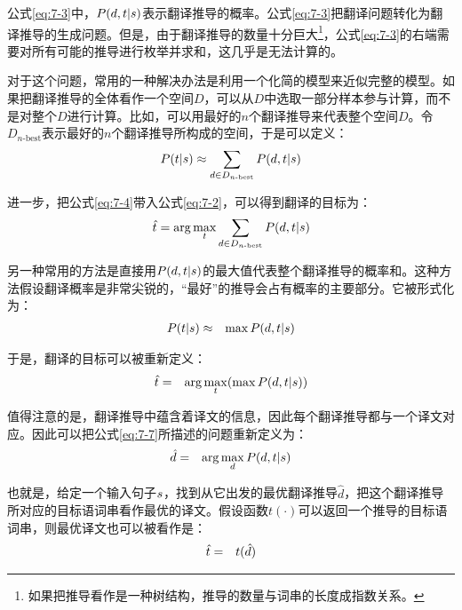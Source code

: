 \parinterval 公式\eqref{eq:7-3}中，${P}(d,{t}|{s})$表示翻译推导的概率。公式\eqref{eq:7-3}把翻译问题转化为翻译推导的生成问题。但是，由于翻译推导的数量十分巨大\footnote[3]{如果把推导看作是一种树结构，推导的数量与词串的长度成指数关系。}，公式\eqref{eq:7-3}的右端需要对所有可能的推导进行枚举并求和，这几乎是无法计算的。

\parinterval 对于这个问题，常用的一种解决办法是利用一个化简的模型来近似完整的模型。如果把翻译推导的全体看作一个空间$D$，可以从$D$中选取一部分样本参与计算，而不是对整个$D$进行计算。比如，可以用最好的$n$个翻译推导来代表整个空间$D$。令$D_{n\textrm{-best}}$表示最好的$n$个翻译推导所构成的空间，于是可以定义：
\begin{eqnarray}
{P}({t}|{s}) \approx \sum_{d \in D_{n\textrm{-best}}} {P}(d,{t}|{s})
\label{eq:7-4}
\end{eqnarray}

\parinterval 进一步，把公式\eqref{eq:7-4}带入公式\eqref{eq:7-2}，可以得到翻译的目标为：
\begin{eqnarray}
\hat{{t}} = \arg\max_{{t}} \sum_{d \in D_{n\textrm{-best}}} {P}(d,{t}|{s})
\label{eq:7-5}
\end{eqnarray}

\parinterval 另一种常用的方法是直接用${P}(d,{t}|{s})$的最大值代表整个翻译推导的概率和。这种方法假设翻译概率是非常尖锐的，“最好”的推导会占有概率的主要部分。它被形式化为：
\begin{eqnarray}
{P}({t}|{s}) & \approx & \max {P}(d,{t}|{s})
\label{eq:7-6}
\end{eqnarray}

\parinterval 于是，翻译的目标可以被重新定义：
\begin{eqnarray}
\hat{{t}} & = & \arg\max_{{t}} (\max {P}(d,{t}|{s}))
\label{eq:7-7}
\end{eqnarray}

\parinterval 值得注意的是，翻译推导中蕴含着译文的信息，因此每个翻译推导都与一个译文对应。因此可以把公式\eqref{eq:7-7}所描述的问题重新定义为：
\begin{eqnarray}
\hat{d} & = & \arg\max_{d} {P}(d,{t}|{s})
\label{eq:7-8}
\end{eqnarray}

\parinterval 也就是，给定一个输入句子${s}$，找到从它出发的最优翻译推导$\hat{d}$，把这个翻译推导所对应的目标语词串看作最优的译文。假设函数$t(\cdot)$可以返回一个推导的目标语词串，则最优译文也可以被看作是：
\begin{eqnarray}
\hat{{t}} & = & t(\hat{d})
\label{eq:7-9}
\end{eqnarray}

